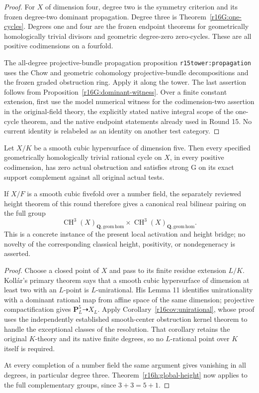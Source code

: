 \begin{proof}
For $X$ of dimension four, degree two is the symmetry
criterion and its frozen degree-two dominant propagation.
Degree three is Theorem~\ref{r16G:one-cycles}.  Degrees
one and four are the frozen endpoint theorems for
geometrically homologically trivial divisors and
geometric degree-zero zero-cycles.  These are all positive
codimensions on a fourfold.

The all-degree projective-bundle propagation proposition
\texttt{r15tower:propagation} uses the Chow and geometric
cohomology projective-bundle decompositions and the
frozen graded obstruction ring.  Apply it along the
tower.  The last assertion follows from
Proposition~\ref{r16G:dominant-witness}.  Over a finite
constant extension, first use the model numerical
witness for the codimension-two assertion in the
original-field theory, the explicitly stated native
integral scope of the one-cycle theorem, and the
native endpoint statements already used in Round 15.
No current identity is relabeled as an identity on
another test category.
\end{proof}

\begin{corollary}
\label{r16G:cubic-fivefold}
Let $X/K$ be a smooth cubic hypersurface of dimension five.
Then every specified geometrically homologically trivial
rational cycle on $X$, in every positive codimension, has
zero actual obstruction and satisfies strong G on its exact
support complement against all original actual tests.

If $X/F$ is a smooth cubic fivefold over a number field, the
separately reviewed height theorem of this round therefore
gives a canonical real bilinear pairing on the full group
\[
 \operatorname{CH}^3(X)_{\mathbf Q,\mathrm{geom\,hom}}
 \times
 \operatorname{CH}^3(X)_{\mathbf Q,\mathrm{geom\,hom}}.
\]
This is a concrete instance of the present local activation
and height bridge; no novelty of the corresponding classical
height, positivity, or nondegeneracy is asserted.
\end{corollary}

\begin{proof}
Choose a closed point of $X$ and pass to its finite residue
extension $L/K$.  Koll\'ar's primary theorem says that a
smooth cubic hypersurface of dimension at least two with
an $L$-point is $L$-unirational.  His Lemma 11 identifies
unirationality with a dominant rational map from affine
space of the same dimension; projective compactification
gives $\mathbf P^5_L\dashrightarrow X_L$.
Apply Corollary~\ref{r16cov:unirational}, whose proof uses
the independently established smooth-center obstruction
kernel theorem to handle the exceptional classes of the
resolution.  That corollary retains the original $K$-theory
and its native finite degrees, so no $L$-rational point
over $K$ itself is required.

At every completion of a number field the same argument
gives vanishing in all degrees, in particular degree three.
Theorem~\ref{r16h:global-height} now applies to the full
complementary groups, since $3+3=5+1$.
\end{proof}

